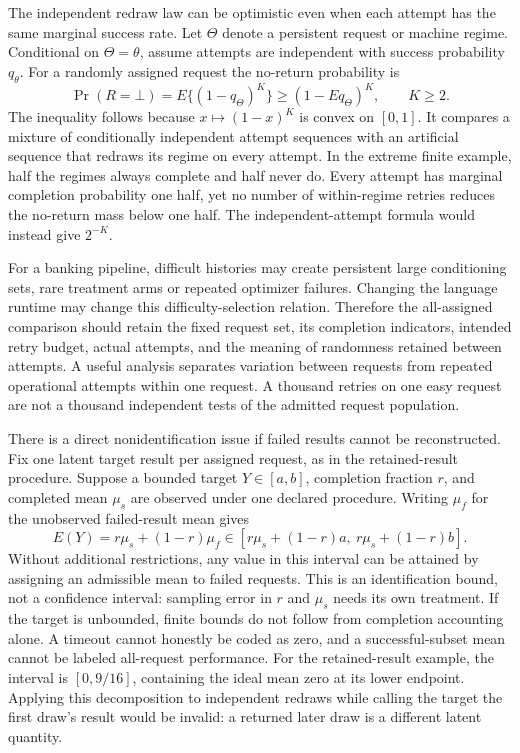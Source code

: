 The independent redraw law can be optimistic even when each attempt has the
same marginal success rate. Let $\Theta$ denote a persistent request or
machine regime. Conditional on $\Theta=\theta$, assume attempts are
independent with success probability $q_\theta$. For a randomly assigned
request the no-return probability is
\begin{equation}
 \Pr(R=\bot)=E\{(1-q_\Theta)^K\}
 \geq (1-Eq_\Theta)^K,\qquad K\geq2.
 \label{exec17:s9-persistent-retry}
\end{equation}
The inequality follows because $x\mapsto(1-x)^K$ is convex on $[0,1]$.
It compares a mixture of conditionally independent attempt sequences with
an artificial sequence that redraws its regime on every attempt. In the
extreme finite example, half the regimes always complete and half never do.
Every attempt has marginal completion probability one half, yet no number
of within-regime retries reduces the no-return mass below one half. The
independent-attempt formula would instead give $2^{-K}$.

For a banking pipeline, difficult histories may create persistent large
conditioning sets, rare treatment arms or repeated optimizer failures.
Changing the language runtime may change this difficulty-selection relation.
Therefore the all-assigned comparison should retain the fixed request set,
its completion indicators, intended retry budget, actual attempts, and the
meaning of randomness retained between attempts. A useful analysis separates
variation between requests from repeated operational attempts within one
request. A thousand retries on one easy request are not a thousand
independent tests of the admitted request population.

There is a direct nonidentification issue if failed results cannot be
reconstructed. Fix one latent target result per assigned request, as in the
retained-result procedure. Suppose a bounded target $Y\in[a,b]$, completion fraction
$r$, and completed mean $\mu_s$ are observed under one declared procedure.
Writing $\mu_f$ for the unobserved failed-result mean gives
\begin{equation}
 E(Y)=r\mu_s+(1-r)\mu_f
 \in[r\mu_s+(1-r)a,\ r\mu_s+(1-r)b].
 \label{exec17:s9-failure-bounds}
\end{equation}
Without additional restrictions, any value in this interval can be attained
by assigning an admissible mean to failed requests. This is an identification
bound, not a confidence interval: sampling error in $r$ and $\mu_s$ needs
its own treatment. If the target is unbounded, finite bounds do not follow
from completion accounting alone. A timeout cannot honestly be coded as
zero, and a successful-subset mean cannot be labeled all-request performance.
For the retained-result example, the interval is $[0,9/16]$, containing
the ideal mean zero at its lower endpoint. Applying this decomposition to
independent redraws while calling the target the first draw's result would
be invalid: a returned later draw is a different latent quantity.

